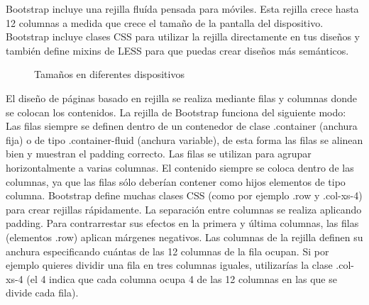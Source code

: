 \documentclass[a4paper, 12pt]{book}
\begin{document}
Bootstrap incluye una rejilla flu\'ida pensada para m\'oviles. Esta rejilla crece hasta 12 columnas a medida que crece el tama\~no de la pantalla del 
dispositivo. Bootstrap incluye clases CSS para utilizar la rejilla directamente en tus dise\~nos y tambi\'en define mixins de LESS para que puedas 
crear dise\~nos m\'as sem\'anticos.

\begin{figure}[htbp] 
  \label{figura:bootstrap}
  \centering
  \caption{Tama\~nos en diferentes dispositivos}
\end{figure}

El dise\~no de p\'aginas basado en rejilla se realiza mediante filas y columnas donde se colocan los contenidos. La rejilla de Bootstrap funciona del
siguiente modo: Las filas siempre se definen dentro de un contenedor de clase .container (anchura fija) o de tipo .container-fluid (anchura variable), 
de esta forma las filas se alinean bien y muestran el padding correcto. Las filas se utilizan para agrupar horizontalmente a varias columnas. 
El contenido siempre se coloca dentro de las columnas, ya que las filas s\'olo deber\'ian contener como hijos elementos de tipo columna. Bootstrap 
define muchas clases CSS (como por ejemplo .row y .col-xs-4) para crear rejillas r\'apidamente. La separaci\'on entre columnas se realiza aplicando 
padding. Para contrarrestar sus efectos en la primera y \'ultima columnas, las filas (elementos .row) aplican m\'argenes negativos. Las columnas de la 
rejilla definen su anchura especificando cu\'antas de las 12 columnas de la fila ocupan. Si por ejemplo quieres dividir una fila en tres columnas 
iguales, utilizar\'ias la clase .col-xs-4 (el 4 indica que cada columna ocupa 4 de las 12 columnas en las que se divide cada fila).
\end{document}
